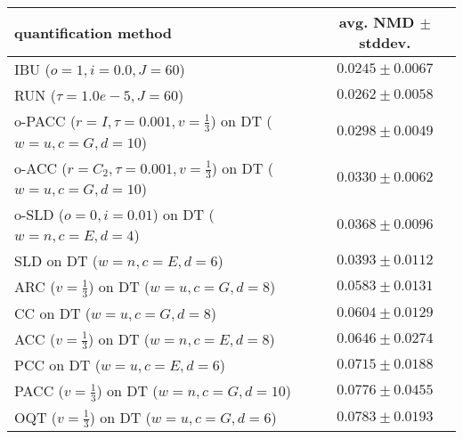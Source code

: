 \begin{tabular}{lc}
  \toprule
  quantification method & avg. NMD $\pm$ stddev. \\
  \midrule
  IBU ($o=1, i=0.0, J=60$) & $\mathbf{0.0245 \pm 0.0067}$ \\
  RUN ($\tau=1.0e-5, J=60$) & $0.0262 \pm 0.0058$ \\
  o-PACC ($r=I, \tau=0.001, v=\frac{1}{3}$) on DT ($w=u, c=G, d=10$) & $0.0298 \pm 0.0049$ \\
  o-ACC ($r=C_2, \tau=0.001, v=\frac{1}{3}$) on DT ($w=u, c=G, d=10$) & $0.0330 \pm 0.0062$ \\
  o-SLD ($o=0, i=0.01$) on DT ($w=n, c=E, d=4$) & $0.0368 \pm 0.0096$ \\
  SLD on DT ($w=n, c=E, d=6$) & $0.0393 \pm 0.0112$ \\
  ARC ($v=\frac{1}{3}$) on DT ($w=u, c=G, d=8$) & $0.0583 \pm 0.0131$ \\
  CC on DT ($w=u, c=G, d=8$) & $0.0604 \pm 0.0129$ \\
  ACC ($v=\frac{1}{3}$) on DT ($w=n, c=E, d=8$) & $0.0646 \pm 0.0274$ \\
  PCC on DT ($w=u, c=E, d=6$) & $0.0715 \pm 0.0188$ \\
  PACC ($v=\frac{1}{3}$) on DT ($w=n, c=G, d=10$) & $0.0776 \pm 0.0455$ \\
  OQT ($v=\frac{1}{3}$) on DT ($w=u, c=G, d=6$) & $0.0783 \pm 0.0193$ \\
  \bottomrule
\end{tabular}
